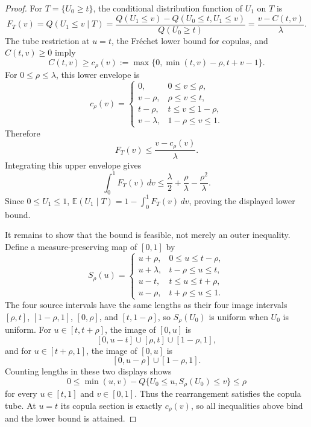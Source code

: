 \documentclass[11pt]{article}
\newcommand{\E}{\mathbb{E}}
\theoremstyle{definition}
\theoremstyle{plain}
\theoremstyle{remark}
\begin{document}
\begin{proof}
For \(T=\{U_0\ge t\}\), the conditional distribution function of \(U_1\) on \(T\) is
\[
F_T(v)=Q(U_1\le v\mid T)=\frac{Q(U_1\le v)-Q(U_0\le t,U_1\le v)}{Q(U_0\ge t)}
=\frac{v-C(t,v)}{\lambda}.
\]
The tube restriction at \(u=t\), the Fr\'echet lower bound for copulas, and \(C(t,v)\ge0\) imply
\[
C(t,v)\ge c_\rho(v):=
\max\{0,\min(t,v)-\rho,t+v-1\}.
\]
For \(0\le\rho\le\lambda\), this lower envelope is
\[
c_\rho(v)=
\begin{cases}
0, & 0\le v\le\rho,\\
v-\rho, & \rho\le v\le t,\\
t-\rho, & t\le v\le1-\rho,\\
v-\lambda, & 1-\rho\le v\le1.
\end{cases}
\]
Therefore
\[
F_T(v)\le\frac{v-c_\rho(v)}{\lambda}.
\]
Integrating this upper envelope gives
\[
\int_0^1 F_T(v)\,dv
\le
\frac{\lambda}{2}+\frac{\rho}{\lambda}-\frac{\rho^2}{\lambda}.
\]
Since \(0\le U_1\le1\), \(\E(U_1\mid T)=1-\int_0^1F_T(v)\,dv\), proving the displayed lower bound.

It remains to show that the bound is feasible, not merely an outer inequality.  Define a measure-preserving map of \([0,1]\) by
\[
S_\rho(u)=
\begin{cases}
u+\rho, & 0\le u\le t-\rho,\\
u+\lambda, & t-\rho\le u\le t,\\
u-t, & t\le u\le t+\rho,\\
u-\rho, & t+\rho\le u\le1.
\end{cases}
\]
The four source intervals have the same lengths as their four image intervals \([\rho,t]\), \([1-\rho,1]\), \([0,\rho]\), and \([t,1-\rho]\), so \(S_\rho(U_0)\) is uniform when \(U_0\) is uniform.  For \(u\in[t,t+\rho]\), the image of \([0,u]\) is
\[
[0,u-t]\cup[\rho,t]\cup[1-\rho,1],
\]
and for \(u\in[t+\rho,1]\), the image of \([0,u]\) is
\[
[0,u-\rho]\cup[1-\rho,1].
\]
Counting lengths in these two displays shows
\[
0\le \min(u,v)-Q\{U_0\le u,S_\rho(U_0)\le v\}\le\rho
\]
for every \(u\in[t,1]\) and \(v\in[0,1]\).  Thus the rearrangement satisfies the copula tube.  At \(u=t\) its copula section is exactly \(c_\rho(v)\), so all inequalities above bind and the lower bound is attained.
\end{proof}
\end{document}
